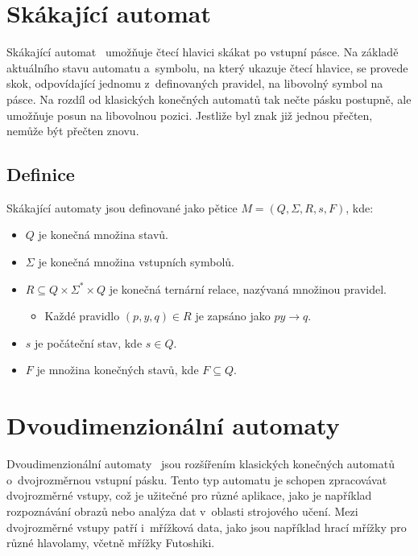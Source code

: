 \section{Skákající automat}
\label{chap:jumpingAutomata}

Skákající automat~\cite{MedunaAlexander2017MLMa} umožňuje čtecí hlavici skákat
po vstupní pásce. Na základě aktuálního stavu automatu a~symbolu, na který
ukazuje čtecí hlavice, se provede skok, odpovídající jednomu z~definovaných
pravidel, na libovolný symbol na pásce. Na rozdíl od klasických konečných
automatů tak nečte pásku postupně, ale umožňuje posun na libovolnou pozici.
Jestliže byl znak již jednou přečten, nemůže být přečten znovu.

\subsection*{Definice}

Skákající automaty jsou definované jako pětice \(M = (Q, \Sigma, R, s, F)\),
kde:
\begin{itemize}
    \item \(Q\) je konečná množina stavů.
    \item \(\Sigma\) je konečná množina vstupních symbolů.
    \item \(R \subseteq Q \times \Sigma^* \times Q\) je konečná ternární
        relace, nazývaná množinou pravidel.
        \begin{itemize}
            \item Každé pravidlo \((p, y, q) \in R\) je zapsáno jako
                \(py \rightarrow q\).
        \end{itemize}
    \item \(s\) je počáteční stav, kde \(s \in Q\).
    \item \(F\) je množina konečných stavů, kde \(F \subseteq Q\).
\end{itemize}

\section{Dvoudimenzionální automaty}

Dvoudimenzionální automaty~\cite{RozenbergGrzegorz1997HoFL} jsou rozšířením
klasických konečných automatů o~dvojrozměrnou vstupní pásku. Tento typ automatu
je schopen zpracovávat dvojrozměrné vstupy, což je užitečné pro různé aplikace,
jako je například rozpoznávání obrazů nebo analýza dat v~oblasti strojového
učení. Mezi dvojrozměrné vstupy patří i~mřížková data, jako jsou například
hrací mřížky pro různé hlavolamy, včetně mřížky Futoshiki.

